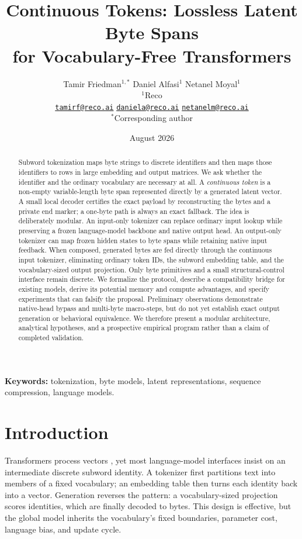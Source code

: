 \documentclass[10pt,twocolumn]{article}
\title{\vspace{-0.48in}\textbf{Continuous Tokens: Lossless Latent Byte Spans\\
  for Vocabulary-Free Transformers}}
\author{
  Tamir Friedman$^{1,*}$ \quad Daniel Alfasi$^1$ \quad Netanel Moyal$^1$\\[2pt]
  \small $^1$Reco\\[-1pt]
  \small \href{mailto:tamirf@reco.ai}{\texttt{tamirf@reco.ai}} \quad
  \href{mailto:daniela@reco.ai}{\texttt{daniela@reco.ai}} \quad
  \href{mailto:netanelm@reco.ai}{\texttt{netanelm@reco.ai}}\\[-1pt]
  \small $^*$Corresponding author
}
\date{\small August 2026}
\begin{document}
\maketitle
\thispagestyle{plain}

\begin{abstract}
Subword tokenization maps byte strings to discrete identifiers and then maps those identifiers to
rows in large embedding and output matrices. We ask whether the identifier and the ordinary
vocabulary are necessary at all. A \emph{continuous token} is a non-empty variable-length byte
span represented directly by a generated latent vector. A small local decoder certifies the exact
payload by reconstructing the bytes and a private end marker; a one-byte path is always an exact
fallback. The idea is deliberately modular. An input-only tokenizer can replace ordinary input
lookup while preserving a frozen language-model backbone and native output head. An output-only
tokenizer can map frozen hidden states to byte spans while retaining native input feedback. When
composed, generated bytes are fed directly through the continuous input tokenizer, eliminating
ordinary token IDs, the subword embedding table, and the vocabulary-sized output projection.
Only byte primitives and a small structural-control interface remain discrete. We formalize the
protocol, describe a compatibility bridge for existing models, derive its potential memory and
compute advantages, and specify experiments that can falsify the proposal. Preliminary observations
demonstrate native-head bypass and multi-byte macro-steps, but do not yet establish exact output
generation or behavioral equivalence. We therefore present a modular architecture, analytical
hypotheses, and a prospective empirical program rather than a claim of completed validation.
\end{abstract}

\noindent\textbf{Keywords:} tokenization, byte models, latent representations, sequence
compression, language models.

\section{Introduction}

Transformers process vectors \citep{vaswani2017attention}, yet most language-model interfaces
insist on an intermediate discrete subword identity. A tokenizer first partitions text into
members of a fixed vocabulary;
an embedding table then turns each identity back into a vector. Generation reverses the pattern:
a vocabulary-sized projection scores identities, which are finally decoded to bytes. This design
is effective, but the global model inherits the vocabulary's fixed boundaries, parameter cost,
language bias, and update cycle.
\end{document}
